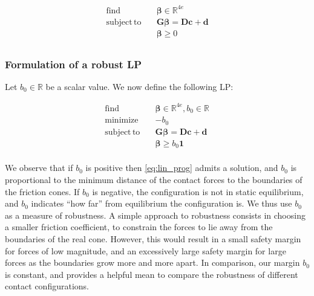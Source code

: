 \documentclass[journal]{IEEEtran}
\DeclareMathOperator*{\st}{subject\,to}					%
\DeclareMathOperator*{\minimize}{minimize}				%
\DeclareMathOperator*{\find}{find}						%
\newcommand{\Rv}[1]{\ensuremath{\mathbb{R}^{#1}}}				%
\begin{document}
\begin{equation} \label{eq:lin_prog} \begin{aligned}
\find \quad & \bm{\beta} \in \Rv{4e} \\
\st \quad &\mathbf{G} \bm{\beta} = \mathbf{D} \mathbf{c} + \mathbf{d} \\
& \bm{\beta} \ge 0 \\
\end{aligned} \end{equation}

\subsubsection{Formulation of a robust LP}
Let $b_0 \in \mathbb{R}$ be a scalar value. We now define the following LP:

\begin{equation} \label{eq:lin_prog_rob} \begin{aligned}
\find \quad & \bm{\beta} \in \Rv{4e}, b_0 \in \Rv{} \\
\minimize  \quad & -b_0 \\
\st \quad &\mathbf{G} \bm{\beta} = \mathbf{D} \mathbf{c} + \mathbf{d} \\
& \bm{\beta} \ge b_0 \bm{1}\\
\end{aligned} \end{equation}

We observe that if $b_0$ is positive then \eqref{eq:lin_prog} admits a solution, and $b_0$ is proportional to the minimum distance of the contact forces to the boundaries of the friction cones.
If $b_0$ is negative, the configuration is not in static equilibrium, and $b_0$ indicates ``how far'' from equilibrium the configuration is. We thus use $b_0$ as a measure of robustness.
A simple approach to robustness consists in choosing a smaller friction coefficient, to constrain the forces to lie away from the boundaries of the real cone.  However, this would result in a small safety margin for forces of low magnitude, and an excessively large safety margin for large forces as the boundaries grow more and more apart. In comparison, our margin $b_0$ is constant, and provides a helpful mean to compare the robustness of different contact configurations.
\end{document}
